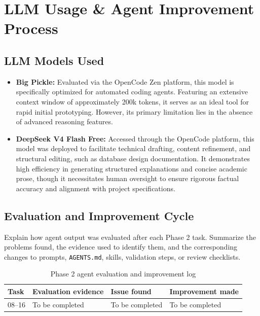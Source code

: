\section{LLM Usage \& Agent Improvement Process}

\subsection{LLM Models Used}
\begin{itemize}
    \item \textbf{Big Pickle:} Evaluated via the OpenCode Zen platform, this
    model is specifically optimized for automated coding agents. Featuring an
    extensive context window of approximately 200k tokens, it serves as an
    ideal tool for rapid initial prototyping. However, its primary limitation
    lies in the absence of advanced reasoning features.

    \item \textbf{DeepSeek V4 Flash Free:} Accessed through the OpenCode
    platform, this model was deployed to facilitate technical drafting,
    content refinement, and structural editing, such as database design
    documentation. It demonstrates high efficiency in generating structured
    explanations and concise academic prose, though it necessitates human
    oversight to ensure rigorous factual accuracy and alignment with project
    specifications.
\end{itemize}

\subsection{Evaluation and Improvement Cycle}
Explain how agent output was evaluated after each Phase 2 task. Summarize the
problems found, the evidence used to identify them, and the corresponding
changes to prompts, \texttt{AGENTS.md}, skills, validation steps, or review
checklists.

\begin{table}[htbp]
    \centering
    \begin{tabularx}{\textwidth}{p{}X X X}
        \toprule
        \textbf{Task} & \textbf{Evaluation evidence} & \textbf{Issue found} & \textbf{Improvement made} \\
        \midrule
        08--16 & To be completed & To be completed & To be completed \\
        \bottomrule
    \end{tabularx}
    \caption{Phase 2 agent evaluation and improvement log}
    \label{tab:phase2-agent-improvement}
\end{table}